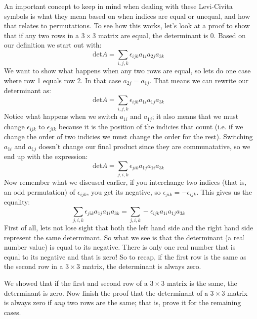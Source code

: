 An important concept to keep in mind when dealing with these Levi-Civita symbols is what they mean based on when indices are equal or unequal, and how that relates to permutations.  To see how this works, let's look at a proof to show that if any two rows in a $3 \times 3$ matrix are equal, the determinant is 0.  Based on our definition we start out with:
\[
\text{det} A = \sum_{i,j,k} \epsilon_{ijk} a_{1i} a_{2j} a_{3k}
\]
We want to show what happens when any two rows are equal, so lets do one case where row 1 equals row 2.  In that case $a_{2j}=a_{1j}$.  That means we can rewrite our determinant as:
\[
\text{det} A =  \sum_{i,j,k} \epsilon_{ijk} a_{1i} a_{1j} a_{3k}
\]
Notice what happens when we switch $a_{1i}$ and $a_{1j}$; it also means that we must change $\epsilon_{ijk}$ to $\epsilon_{jik}$ because it is the position of the indicies that count (i.e. if we change the order of two indicies we must change the order for the rest).  Switching $a_{1i}$ and $a_{1j}$ doesn't change our final product since they are communatative, so we end up with the expression:
\[
\text{det} A =   \sum_{j,i,k} \epsilon_{jik} a_{1j} a_{1i} a_{3k} 
\]
Now remember what we discused earlier, if you interchange two indices (that is, an odd permutation) of $\epsilon_{ijk}$, you get its negative, so $\epsilon_{jik}=-\epsilon_{ijk}$.  This gives us the equality:
\[
\sum_{j,i,k} \epsilon_{jik} a_{1j} a_{1i} a_{3k}=\sum_{j,i,k} - \epsilon_{ijk} a_{1i} a_{1j} a_{3k}
\]
First of all, lets not lose sight that both the left hand side and the right hand side represent the same determinant.  So what we see is that the determinant (a real number value) is equal to its negative.  There is only one real number that is equal to its negative and that is zero!  So to recap, if the first row is the same as the second row in a $3\times 3$ matrix, the determinant is always zero.

\begin{exercise}{}
We showed that if the first and second row of a $3\times 3$ matrix is the same, the determinant is zero.  Now finish the proof that the determinant of a $3\times 3$ matrix is always zero if \emph{any} two rows are the same; that is, prove it for the remaining cases.
\end{exercise}{} 

